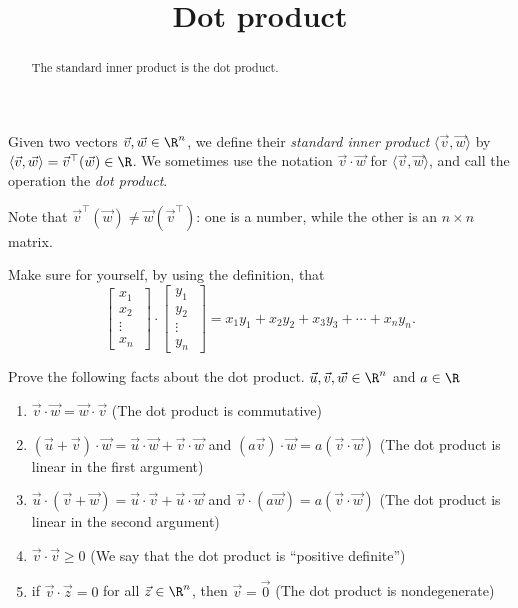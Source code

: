 \documentclass{ximera}
\title{Dot product}
\begin{document}
\begin{abstract}
  The standard inner product is the dot product.
\end{abstract}
\maketitle

\begin{definition}
  Given two vectors $\vec{v},\vec{w} \in \R^n$, we define their \textit{standard inner product} $\langle \vec{v}, \vec{w}\rangle$ by $\langle \vec{v},\vec{w} \rangle = \vec{v}^\top(\vec{w}) \in \R$.  We sometimes use the notation 
  $\vec{v} \cdot \vec{w}$ for $\langle \vec{v} , \vec{w} \rangle$, and call the operation the \textit{dot product}. 
\end{definition}

\begin{warning}
  Note that $\vec{v}^\top(\vec{w}) \neq \vec{w}(\vec{v}^\top)$: one is a number, while the other is an $n\times n$ matrix.
\end{warning}

\begin{question}
  Make sure for yourself, by using the definition, that 
  \[\begin{bmatrix} x_1 \\x_2\\ \vdots \\ x_n\ \end{bmatrix} \cdot \begin{bmatrix} y_1 \\y_2\\ \vdots \\ y_n\ \end{bmatrix}  = x_1y_1+x_2y_2+x_3y_3 + \cdots +x_ny_n.\]
\end{question}

Prove the following facts about the dot product.  $\vec{u},\vec{v},\vec{w} \in \R^n$ and $a \in \R$
\begin{enumerate}
\item $\vec{v} \cdot \vec{w} = \vec{w} \cdot \vec{v}$ (The dot product is commutative)
			
\item $(\vec{u}+\vec{v})\cdot \vec{w} = \vec{u}\cdot \vec{w} + \vec{v}\cdot \vec{w}$ 	and $(a\vec{v})\cdot \vec{w} = a(\vec{v} \cdot \vec{w})$ (The dot product is linear in the first argument)
			
\item $\vec{u} \cdot (\vec{v}+\vec{w}) = \vec{u}\cdot \vec{v}+ \vec{u}\cdot \vec{w}$ and  $\vec{v} \cdot (a\vec{w}) = a(\vec{v} \cdot  \vec{w})$ (The dot product is linear in the second argument)
			
\item $\vec{v}\cdot \vec{v} \geq 0$ (We say that the dot product is ``positive definite'')
			
\item if $\vec{v} \cdot \vec{z} = 0$ for all $\vec{z} \in \R^n$, then $\vec{v} =\vec{0}$ (The dot product is nondegenerate)
\end{enumerate}
	
\end{document}
